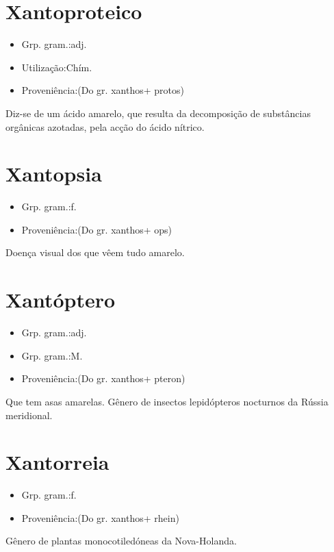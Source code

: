 \section{Xantoproteico}
\begin{itemize}
\item {Grp. gram.:adj.}
\end{itemize}
\begin{itemize}
\item {Utilização:Chím.}
\end{itemize}
\begin{itemize}
\item {Proveniência:(Do gr. \textunderscore xanthos\textunderscore  + \textunderscore protos\textunderscore )}
\end{itemize}
Diz-se de um ácido amarelo, que resulta da decomposição de substâncias orgânicas azotadas, pela acção do ácido nítrico.
\section{Xantopsia}
\begin{itemize}
\item {Grp. gram.:f.}
\end{itemize}
\begin{itemize}
\item {Proveniência:(Do gr. \textunderscore xanthos\textunderscore  + \textunderscore ops\textunderscore )}
\end{itemize}
Doença visual dos que vêem tudo amarelo.
\section{Xantóptero}
\begin{itemize}
\item {Grp. gram.:adj.}
\end{itemize}
\begin{itemize}
\item {Grp. gram.:M.}
\end{itemize}
\begin{itemize}
\item {Proveniência:(Do gr. \textunderscore xanthos\textunderscore  + \textunderscore pteron\textunderscore )}
\end{itemize}
Que tem asas amarelas.
Gênero de insectos lepidópteros nocturnos da Rússia meridional.
\section{Xantorreia}
\begin{itemize}
\item {Grp. gram.:f.}
\end{itemize}
\begin{itemize}
\item {Proveniência:(Do gr. \textunderscore xanthos\textunderscore  + \textunderscore rhein\textunderscore )}
\end{itemize}
Gênero de plantas monocotiledóneas da Nova-Holanda.
